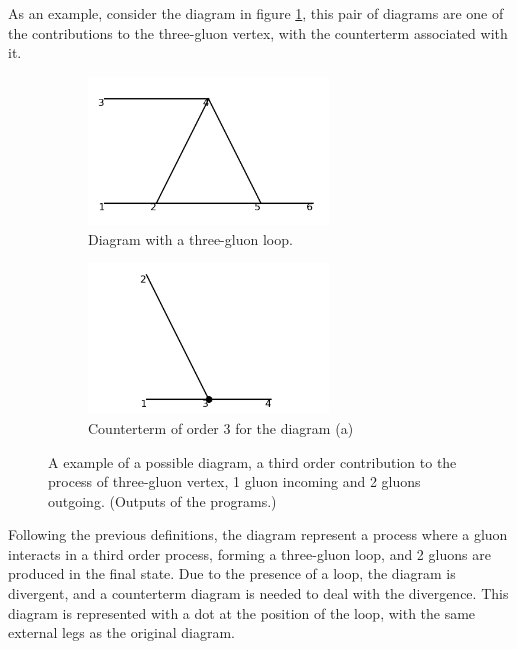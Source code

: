 \documentclass[11pt,a4paper,twoside,pdf]{article}
\numberwithin{equation}{section}
\begin{document}
As an example, consider the diagram in figure \ref{fig:example_diagram}, this pair of 
diagrams are one of the contributions to the three-gluon vertex, with the counterterm 
associated with it. 

\begin{figure}[h!]
    \centering
    \begin{subfigure}[t]{0.5\textwidth}
        \centering
        \includegraphics[width=0.7\textwidth]{plots/order3/order3_1to2/1.png}
        \caption{Diagram with a three-gluon loop.}
    \end{subfigure}%
    \begin{subfigure}[t]{0.5\textwidth}
        \centering
        \includegraphics[width=0.7\textwidth]{plots/order3/order3_1to2/counterterms/1.png}
        \caption{Counterterm of order 3 for the diagram (a)}
    \end{subfigure}
    \caption{A example of a possible diagram, a third order contribution to the 
    process of three-gluon vertex, 1 gluon incoming and 2 gluons outgoing. (Outputs of 
    the programs.)}
    \label{fig:example_diagram}
\end{figure}

Following the previous definitions, the diagram represent a process where a gluon
interacts in a third order process, forming a three-gluon loop, and 2 gluons are 
produced in the final state. Due to the presence of a loop, the diagram is
divergent, and a counterterm diagram is needed to deal with the divergence. This 
diagram is represented with a dot at the position of the loop, with the same 
external legs as the original diagram. 
\end{document}
